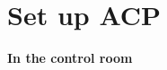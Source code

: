 \documentclass[letterpaper, 12pt]{report}
\newcommand{\location}[1]{\noindent\large{\textbf{#1}}}
\newcommand{\incontrol}{\location{In the control room}}
\begin{document}
\begin{itemize}
%
\end{itemize}

\section{Set up ACP}
\incontrol
\end{document}
